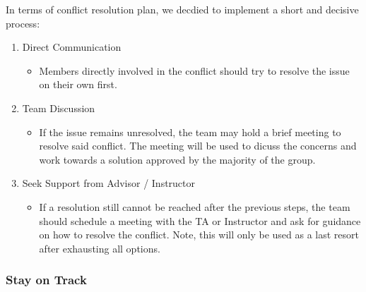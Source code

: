 \documentclass{article}
\begin{document}
In terms of conflict resolution plan, we decdied to implement a short and decisive process: \\
\begin{enumerate}
  \item Direct Communication
  \begin{itemize}
    \item Members directly involved in the conflict should try to resolve the issue on their own first. 
  \end{itemize}
  \item Team Discussion
  \begin{itemize}
    \item If the issue remains unresolved, the team may hold a brief meeting to resolve said conflict. The meeting will be used to dicuss the concerns and work towards a solution approved by the majority of the group.
  \end{itemize}
  \item Seek Support from Advisor / Instructor
  \begin{itemize}
    \item If a resolution still cannot be reached after the previous steps, the team should schedule a meeting with the TA or Instructor and ask for guidance on how to resolve the conflict. Note, this will only be used as a last resort after exhausting all options.
  \end{itemize}
\end{enumerate}

\subsubsection*{Stay on Track}



 \\
\end{document}
